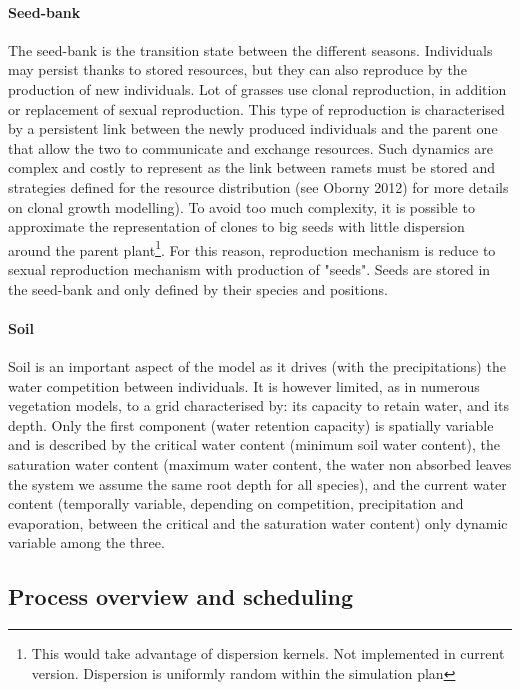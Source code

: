 \documentclass[a4paper,twoside, justified,marginals=raggedright, nobib]{tufte-handout}
\begin{document}
\paragraph{Seed-bank} The seed-bank is the transition state between the different seasons. Individuals may persist thanks to stored resources, but they can also reproduce by the production of new individuals. Lot of grasses use clonal reproduction, in addition or replacement of sexual reproduction. This type of reproduction is characterised by a persistent link between the newly produced individuals and the parent one that allow the two to communicate and exchange resources. Such dynamics are complex and costly to represent as the link between ramets must be stored and strategies defined for the resource distribution (see Oborny 2012) for more details on clonal growth modelling). To avoid too much complexity, it is possible to approximate the representation of clones to big seeds with little dispersion around the parent plant\footnote{This would take advantage of dispersion kernels. Not implemented in current version. Dispersion is uniformly random within the simulation plan}. For this reason, reproduction mechanism is reduce to sexual reproduction mechanism with production of "seeds". Seeds are stored in the seed-bank and only defined by their species and positions. 

\paragraph{Soil} Soil is an important aspect of the model as it drives (with the precipitations) the water competition between individuals. It is however limited, as in numerous vegetation models, to a grid characterised by: its capacity to retain water, and its depth. Only the first component (water retention capacity) is spatially variable and is described by the critical water content (minimum soil water content), the saturation water content (maximum water content, the water non absorbed leaves the system we assume the same root depth for all species), and the current water content (temporally variable, depending on competition, precipitation and evaporation, between the critical and the saturation water content) only dynamic variable among the three.


\subsection{Process overview and scheduling}
\end{document}
